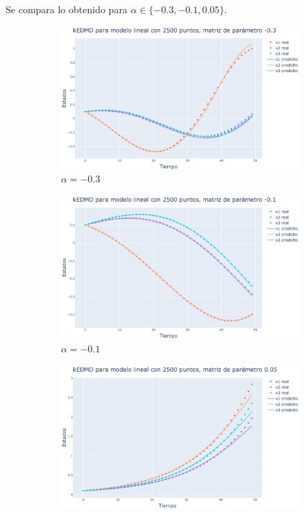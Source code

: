 Se compara lo obtenido para $\alpha \in \{ -0.3, -0.1, 0.05\}$.
\begin{figure}[htbp]
    \centering
    \begin{subfigure}[b]{0.32\textwidth}
        \centering
        \includegraphics[width=\textwidth]{img/content/chapter3/Linear1.pdf}
        \caption{$\alpha=-0.3$}
        \label{fig:image1}
    \end{subfigure}
    \hfill
    \begin{subfigure}[b]{0.32\textwidth}
        \centering
        \includegraphics[width=\textwidth]{img/content/chapter3/Linear2.pdf}
        \caption{$\alpha=-0.1$}
        \label{fig:image2}
    \end{subfigure}
    \hfill
    \begin{subfigure}[b]{0.32\textwidth}
        \centering
        \includegraphics[width=\textwidth]{img/content/chapter3/Linear3.pdf}

\end{subfigure}
\end{figure}
